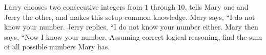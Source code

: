 Larry chooses two consecutive integers from $1$ through $10$, tells Mary one and Jerry the other, and makes this setup common knowledge. Mary says, ``I do not know your number. Jerry replies, ``I do not know your number either. Mary then says, ``Now I know your number. Assuming correct logical reasoning, find the sum of all possible numbers Mary has.
